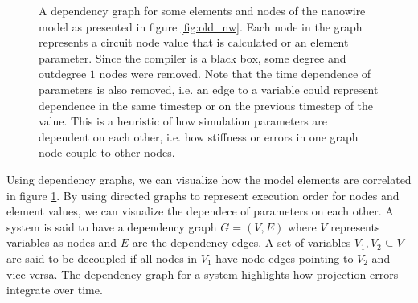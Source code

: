 \documentclass[]{article}
\newcommand{\todoref}[2][]{}
\newcommand{\todoexplain}[2][]{}
\begin{document}
\begin{figure}
    \centering
    \caption{A dependency graph for some elements and nodes of the nanowire model as presented in
    figure \ref{fig:old_nw}. Each node in the graph represents
    a circuit node value that is calculated or an element parameter.
    Since the compiler is a black box,
    some degree and outdegree $1$ nodes were removed. Note that the time dependence
    of parameters is also removed, i.e. an edge to a variable could represent
    dependence in the same timestep or on the previous timestep of the value.
    This is a heuristic of how simulation parameters
    are dependent on each other, i.e. how stiffness or errors in one graph node couple to other nodes.}
    \label{fig:dependency_graph}
\end{figure}

Using dependency graphs, we can visualize how the model elements
are correlated in figure \ref{fig:dependency_graph}. 
By using directed graphs to represent execution 
order for nodes and element values, we can visualize the dependece
of parameters on each other. A system is said to have a dependency graph $G = (V, E)$
where $V$ represents variables as nodes and $E$ are the dependency edges.
A set of variables $V_1, V_2 \subseteq V$ are said to be decoupled if all nodes
in $V_1$ have node edges pointing to $V_2$ and vice versa. The dependency
graph for a system highlights how projection errors integrate over time.
\todoexplain[]{Explain why cycle, why thermal integrator projections...}
\todoref[]{citation from book Software Testing and Analysis: Process, Principles, and Techniques. Chapter 6}
\todoref[]{dragon book??}
\end{document}

